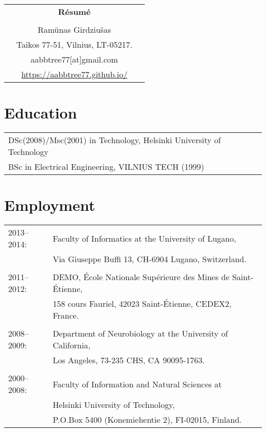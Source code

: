 \documentclass[a4paper,11pt]{article}
\begin{document}
\thispagestyle{empty}

%
%
\begin{center}
\begin{tabular}{ccc}
&\Large \textbf{R\'{e}sum\'{e}}&\\
\\
& Ram\={u}nas Girdziu\v{s}as &\\  
& Taikos 77-51, Vilnius, LT-05217. &\\
& aabbtree77[at]gmail.com &\\
& \url{https://aabbtree77.github.io/}
\end{tabular}
\end{center}
%
\section*{Education}
%
\begin{tabular}{ll}
        DSc(2008)/Msc(2001) in Technology, Helsinki University of Technology \\
        BSc in Electrical Engineering, VILNIUS TECH (1999)
\end{tabular}
%
\section*{Employment}
%
\begin{tabular}{ll}
2013--2014: & Faculty of Informatics at the University of Lugano,\\
                        & Via Giuseppe Buffi 13, CH-6904 Lugano, Switzerland. \\
&\\
2011--2012: & DEMO, \'{E}cole Nationale Sup\'{e}rieure des Mines de Saint-\'{E}tienne,\\
&158 cours Fauriel, 42023 Saint-\'Etienne, CEDEX2, France. \\
&\\
2008--2009: & Department of Neurobiology at the University of California,\\
&Los Angeles, 73-235 CHS, CA 90095-1763. \\
&\\
2000--2008: & Faculty of Information and Natural Sciences at\\
            & Helsinki University of Technology,\\ 
&  P.O.Box 5400 (Konemiehentie 2), FI-02015, Finland. \\
\end{tabular}
\end{document}
